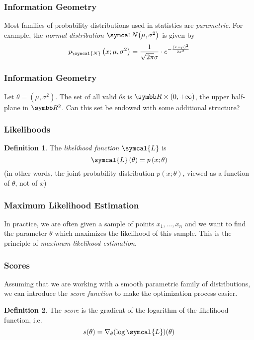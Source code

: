 \documentclass{beamer}
\theoremstyle{definition}
\newtheorem*{definition*}{Definition}
\begin{document}
\begin{frame}
\frametitle{Information Geometry}

Most families of probability distributions used in statistics are \emph{parametric}. For example, the \emph{normal distribution} \(\normal{\mu}{\sigma^2}\) is given by
\[
    p_{\symcal{N}} \left(x; \mu, \sigma^2\right) = \frac{1}{\sqrt{2 \pi} \sigma} \cdot e^{- \frac{(x - \mu)^2}{2 \sigma^2}}
\]
\end{frame}

\begin{frame}
\frametitle{Information Geometry}

Let \(\theta = \left(\mu, \sigma^2\right)\). The set of all valid \(\theta\)s is \(\reals \times \left(0, +\infty\right)\), the upper half-plane in \(\reals^2\). Can this set be endowed with some additional structure?
\end{frame}

\begin{frame}
\frametitle{Likelihoods}

\begin{definition*}
The \emph{likelihood function} \(\symcal{L}\) is
\[
    \symcal{L} \left(\theta\right) = p\left(x; \theta\right)
\]
(in other words, the joint probability distribution \(p\left(x; \theta\right)\), viewed as a function of \(\theta\), not of \(x\))
\end{definition*}
\end{frame}

\begin{frame}
\frametitle{Maximum Likelihood Estimation}

In practice, we are often given a sample of points \(x_1, \dots, x_n\) and we want to find the parameter \(\theta\) which maximizes the likelihood of this sample. This is the principle of \emph{maximum likelihood estimation}.
\end{frame}

\begin{frame}
\frametitle{Scores}

Assuming that we are working with a smooth parametric family of distributions, we can introduce the \emph{score function} to make the optimization process easier.

\begin{definition*}
The \emph{score} is the gradient of the logarithm of the likelihood function, i.e.\
\[
    s(\theta) = \nabla_{\theta} (\log \symcal{L}) (\theta)
\]
\end{definition*}
\end{frame}
\end{document}

